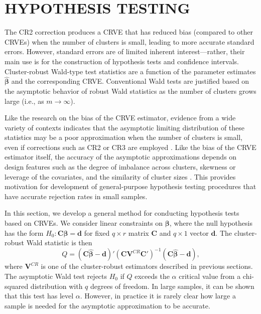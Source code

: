 \documentclass[12pt]{article}\usepackage[]{graphicx}\usepackage[]{color}
\newcommand{\bm}{\mathbf}
\newcommand{\bs}{\boldsymbol}
\begin{document}
\section{HYPOTHESIS TESTING}
\label{sec:testing}

The CR2 correction produces a CRVE that has reduced bias (compared to other CRVEs) when the number of clusters is small, leading to more accurate standard errors. However, standard errors are of limited inherent interest---rather, their main use is for the construction of hypothesis tests and confidence intervals.
Cluster-robust Wald-type test statistics are a function of the parameter estimates $\bs{\hat\beta}$ and the corresponding CRVE.
Conventional Wald tests are justified based on the asymptotic behavior of robust Wald statistics as the number of clusters grows large (i.e., as $m \to \infty$). 

Like the research on the bias of the CRVE estimator, evidence from a wide variety of contexts indicates that the asymptotic limiting distribution of these statistics may be a poor approximation when the number of clusters is small, even if corrections such as CR2 or CR3 are employed \citep{Bell2002bias, Bertrand2004how, Cameron2008bootstrap}. 
Like the bias of the CRVE estimator itself, the accuracy of the asymptotic approximations depends on design features such as the degree of imbalance across clusters, skewness or leverage of the covariates, and the similarity of cluster sizes \citep{McCaffrey2001generalizations, Tipton2015small-F, Webb2013wild, Carter2013asymptotic}. 
This provides motivation for development of general-purpose hypothesis testing procedures that have accurate rejection rates in small samples.

In this section, we develop a general method for conducting hypothesis tests based on CRVEs. We consider linear constraints on $\bs\beta$, where the null hypothesis has the form $H_0: \bm{C}\bs\beta = \bm{d}$ for fixed $q \times r$ matrix $\bm{C}$ and $q \times 1$ vector $\bm{d}$. 
The cluster-robust Wald statistic is then
\begin{equation}
\label{eq:Wald_stat}
Q = \left(\bm{C}\bs{\hat\beta} - \bm{d}\right)'\left(\bm{C} \bm{V}^{CR} \bm{C}'\right)^{-1}\left(\bm{C}\bs{\hat\beta} - \bm{d}\right),
\end{equation}
where $\bm{V}^{CR}$ is one of the cluster-robust estimators described in previous sections. 
The asymptotic Wald test rejects $H_0$ if $Q$ exceeds the $\alpha$ critical value from a chi-squared distribution with $q$ degrees of freedom. 
In large samples, it can be shown that this test has level $\alpha$. 
However, in practice it is rarely clear how large a sample is needed for the asymptotic approximation to be accurate. 
\end{document}
